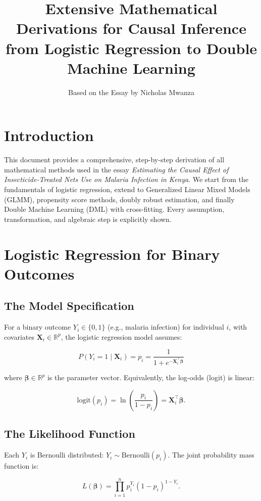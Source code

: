\documentclass[12pt]{article}
\title{Extensive Mathematical Derivations for Causal Inference\\ from Logistic Regression to Double Machine Learning}
\author{Based on the Essay by Nicholas Mwanza}
\date{}
\begin{document}
	
	\maketitle
	
	\tableofcontents
	
	\section{Introduction}
	
	This document provides a comprehensive, step-by-step derivation of all mathematical methods used in the essay \textit{Estimating the Causal Effect of Insecticide-Treated Nets Use on Malaria Infection in Kenya}. We start from the fundamentals of logistic regression, extend to Generalized Linear Mixed Models (GLMM), propensity score methods, doubly robust estimation, and finally Double Machine Learning (DML) with cross-fitting. Every assumption, transformation, and algebraic step is explicitly shown.
	
	\section{Logistic Regression for Binary Outcomes}
	
	\subsection{The Model Specification}
	
	For a binary outcome $Y_i \in \{0,1\}$ (e.g., malaria infection) for individual $i$, with covariates $\mathbf{X}_i \in \mathbb{R}^p$, the logistic regression model assumes:
	
	\[
	P(Y_i = 1 \mid \mathbf{X}_i) = p_i = \frac{1}{1 + e^{-\mathbf{X}_i^\top \boldsymbol{\beta}}}
	\]
	
	where $\boldsymbol{\beta} \in \mathbb{R}^p$ is the parameter vector. Equivalently, the log-odds (logit) is linear:
	
	\[
	\text{logit}(p_i) = \ln\left(\frac{p_i}{1-p_i}\right) = \mathbf{X}_i^\top \boldsymbol{\beta}.
	\]
	
	\subsection{The Likelihood Function}
	
	Each $Y_i$ is Bernoulli distributed: $Y_i \sim \text{Bernoulli}(p_i)$. The joint probability mass function is:
	
	\[
	L(\boldsymbol{\beta}) = \prod_{i=1}^n p_i^{Y_i} (1-p_i)^{1-Y_i}.
	\]
	
\end{document}
